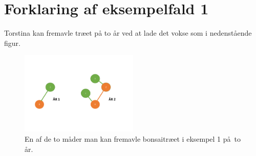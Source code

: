 \section*{Forklaring af eksempelfald 1}
Torstina kan fremavle træet på to år ved at lade det vokse som i nedenstående figur.

\begin{figure}[h]
	\centering
\includegraphics[width=0.5\textwidth]{Bonsai_tree}
\caption{En af de to måder man kan fremavle bonsaitræet i eksempel  1 på to år.}
\end{figure}
